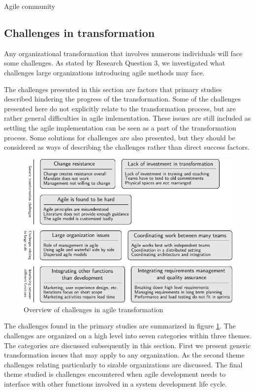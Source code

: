 \documentclass[preprint,authoryear,12pt]{elsarticle}
\begin{document}
Agile community


\clearpage

\subsection{Challenges in transformation}

Any organizational transformation that involves numerous individuals will face
some challenges. As stated by Research Question 3, we investigated what
challenges large organizations introducing agile methods may face.

The challenges presented in this section are factors that primary studies
described hindering the progress of the transformation. Some of the challenges
presented here do not explicitly relate to the transformation process, but are
rather general difficulties in agile imlementation. These issues are still
included as settling the agile implementation can be seen as a part of the
transformation process. Some solutions for challenges are also presented, but
they should be considered as ways of describing the challenges rather than
direct success factors.

\begin{figure}[!b]
  \begin{center}
    \includegraphics{graphics/challenges_summary.pdf}
    \caption{Overview of challenges in agile transformation}
    \label{fig:challenges_summary}
  \end{center}
\end{figure}

The challenges found in the primary studies are summarized in figure
\ref{fig:challenges_summary}. The challenges are organized on a high level into
seven categories within three themes. The categories are discussed subsequently
in this section. First we present generic transformation issues that may apply
to any organization. As the second theme challenges relating particularly to
sizable organizations are discussed. The final theme studied is challenges
encountered when agile development needs to interface with other functions
involved in a system development life cycle.
\end{document}
